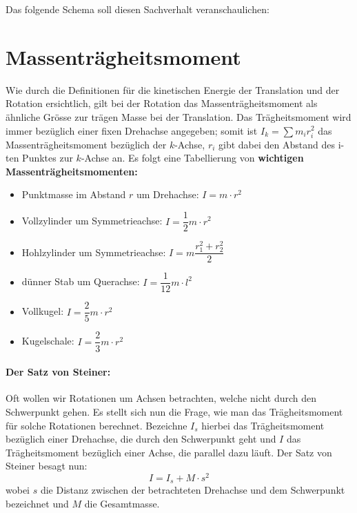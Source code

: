 \documentclass[12pt]{article}
\begin{document}
Das folgende Schema soll diesen Sachverhalt veranschaulichen:

\begin{figure}[H]
  \label{fig:1teil}
\end{figure}

\newpage
\section{Massenträgheitsmoment}

Wie durch die Definitionen für die kinetischen Energie der Translation und der Rotation ersichtlich, gilt bei der Rotation das Massenträgheitsmoment als ähnliche Grösse zur trägen Masse bei der Translation. Das Trägheitsmoment wird immer bezüglich einer fixen Drehachse angegeben; somit ist $I_k = \sum m_i r_i^2$ das Massenträgheitsmoment bezüglich der $k$-Achse, $r_i$ gibt dabei den Abstand des i-ten Punktes zur $k$-Achse an. Es folgt eine Tabellierung von \textbf{wichtigen Massenträgheitsmomenten:}

\begin{itemize}
\item Punktmasse im Abstand $r$ um Drehachse: $I = m\cdot r^2$
\item Vollzylinder um Symmetrieachse: $I = \dfrac{1}{2}m\cdot r^2$
\item Hohlzylinder um Symmetrieachse: $I = m \dfrac{r_1^2 + r_2^2}{2}$
\item dünner Stab um Querachse: $I = \dfrac{1}{12}m \cdot l^2$
\item Vollkugel: $I = \dfrac{2}{5}m \cdot r^2$
\item Kugelschale: $I = \dfrac{2}{3}m \cdot r^2$
\end{itemize}

\paragraph{Der Satz von Steiner:}
Oft wollen wir Rotationen um Achsen betrachten, welche nicht durch den Schwerpunkt gehen. Es stellt sich nun die Frage, wie man das Trägheitsmoment für solche Rotationen berechnet.
Bezeichne $I_s$ hierbei das Trägheitsmoment bezüglich einer Drehachse, die durch den Schwerpunkt geht und $I$ das Trägheitsmoment bezüglich einer Achse, die parallel dazu läuft. Der Satz von Steiner besagt nun:
\begin{equation}
I = I_s + M \cdot s^2
\end{equation}
wobei $s$ die Distanz zwischen der betrachteten Drehachse und dem Schwerpunkt bezeichnet und $M$ die Gesamtmasse.
\end{document}
